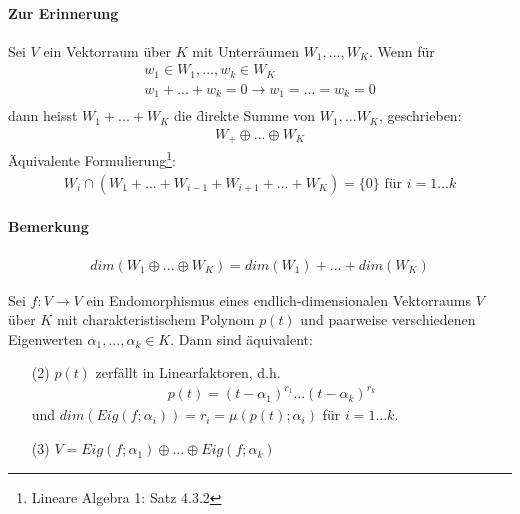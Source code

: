 \paragraph{Zur Erinnerung}
Sei $V$ ein Vektorraum über $K$ mit Unterräumen $W_1, ..., W_K$. Wenn für 
\begin{align}
w_1 \in W_1, ..., w_k \in W_K \\
w_1 + ... + w_k = 0 \rightarrow w_1 = ... = w_k = 0 \\
\end{align}
dann heisst $W_1 + ... + W_K$ die \f{direkte Summe} von $W_1, ... W_K$, geschrieben:
\begin{align}
W_+ \oplus  ... \oplus  W_K
\end{align}
\small
Äquivalente Formulierung\footnote{Lineare Algebra 1: Satz 4.3.2}:
\begin{align}
W_i \cap (W_1 + ... + W_{i-1} + W_{i+1} + ... + W_K) = \{0\} \text{ für } i = 1...k
\end{align}
\normalsize

\paragraph{Bemerkung}
\begin{align}
dim(W_1 \oplus  ... \oplus  W_K) = dim(W_1) + ... + dim(W_K)
\end{align}

\begin{satz} %
\label{satz246}
Sei $f: V \rightarrow V$ ein Endomorphismus eines endlich-dimensionalen Vektorraums $V$ über $K$ mit charakteristischem Polynom $p(t)$ und paarweise verschiedenen Eigenwerten $\alpha_1, ..., \alpha_k \in K$. Dann sind äquivalent:
\begin{itemize}
\item[(2)] $p(t)$ zerfällt in Linearfaktoren, d.h. 
\begin{align}
p(t) = (t - \alpha_1)^{r_1}...(t- \alpha_{k})^{r_k}
\end{align}
und $dim(Eig(f; \alpha_i)) = r_i = \mu(p(t); \alpha_i)$ für $i=1...k$.
\item[(3)] $V = Eig(f; \alpha_1) \oplus  ... \oplus  Eig(f; \alpha_k)$
\end{itemize}
\end{satz}


